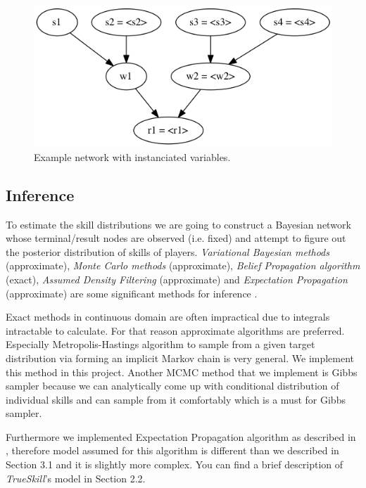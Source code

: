 \documentclass[12pt]{article}
\begin{document}
\begin{itemize}
	\begin{figure}[!ht]
		\centering
		\includegraphics[width=0.7\columnwidth]{baynet_3}
		\caption{Example network with instanciated variables.}
		\label{baynet_3}
	\end{figure}
\end{itemize}
\clearpage


\subsection{Inference}
To estimate the skill distributions we are going to construct a Bayesian network whose terminal/result nodes are observed (i.e. fixed) and attempt to figure out the posterior distribution of skills of players. \textit{Variational Bayesian methods }(approximate), \textit{Monte Carlo methods }(approximate), \textit{Belief Propagation algorithm }(exact), \textit{Assumed Density Filtering }(approximate) and \textit{Expectation Propagation }(approximate) are some significant methods for inference \cite{minka2001family}.

Exact methods in continuous domain are often impractical due to integrals intractable to calculate. For that reason approximate algorithms are preferred. Especially Metropolis-Hastings algorithm to sample from a given target distribution via forming an implicit Markov chain is very general. We implement this method in this project. Another MCMC method that we implement is Gibbs sampler because we can analytically come up with conditional distribution of individual skills and can sample from it comfortably which is a must for Gibbs sampler.

Furthermore we implemented Expectation Propagation algorithm as described in \cite{minka2006trueskilll}, therefore model assumed for this algorithm is different than we described in Section 3.1 and it is slightly more complex. You can find a brief description of \textit{TrueSkill}'s model in Section 2.2.
\end{document}
